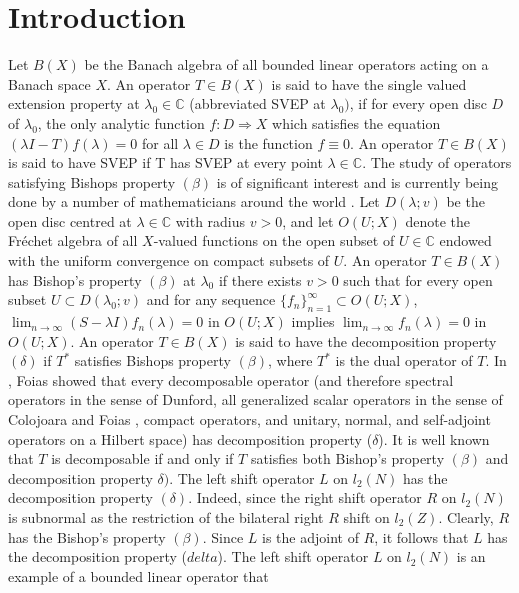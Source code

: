 \documentclass[12pt,a4paper]{amsart}
\begin{document}
\section{Introduction}
Let $B(X)$ be the Banach algebra of all bounded linear operators
acting on a Banach space $X$. An operator $T \in B(X)$ is said to
have the single valued extension property at $\lambda_{0}\in
\mathbb{C}$ (abbreviated SVEP at $\lambda_{0})$, if for every open
disc $D$ of $\lambda_{0}$, the only analytic function $f : D
\Rightarrow X$ which satisfies the equation $(\lambda
I-T)f(\lambda) = 0$ for all $\lambda\in D$ is the function
$f\equiv 0$. An operator $T \in B(X)$ is said to have SVEP if T
has SVEP at every point $\lambda\in\mathbb{C}$. The study of
operators satisfying Bishops property $(\beta)$ is of significant
interest and is currently being done by a number of mathematicians
around the world \cite{17,18,19,20,21}. Let $D(\lambda; v)$ be the
open disc centred at $\lambda\in\mathbb{C}$ with radius $v
> 0$, and let $O(U;X)$ denote the Fr\'echet algebra of all
$X$-valued functions on the open subset of $U\in\mathbb{C}$
endowed with the uniform convergence on compact subsets of $U$. An
operator $T\in B(X)$ has Bishop's property $(\beta)$ at
$\lambda_{0}$ if there exists $v>0$ such that for every open
subset $U \subset D(\lambda_{0}; v)$ and for any sequence
$\{f_{n}\}^{\infty}_{n=1} \subset O(U;X)$, $\lim_{n\rightarrow
\infty}(S-\lambda I)f_{n}(\lambda) = 0$ in $O(U;X)$ implies
$\lim_{n\rightarrow \infty} f_{n}(\lambda) = 0$ in $O(U;X)$. An
operator $T\in B(X)$ is said to have the decomposition property
$(\delta)$ if $T^{ *}$ satisfies Bishops property $(\beta)$, where
$T^{*}$ is the dual operator of $T$. In \cite{6}, Foias showed
that every decomposable operator (and therefore spectral operators
in the sense of Dunford, all generalized scalar operators in the
sense of Colojoara and Foias \cite{6}, compact operators, and
unitary, normal, and self-adjoint operators on a Hilbert space)
has decomposition property ($\delta$). It is well known that $T$
is decomposable if and only if $T$ satisfies both Bishop's
property $(\beta)$ and decomposition property $\delta)$. The left
shift operator $L$ on $l_{2}(N)$ has the decomposition property
$(\delta)$. Indeed, since the right shift operator $R$ on
$l_{2}(N)$ is subnormal as the restriction of the bilateral right
$R$ shift on $l_{2}(Z)$. Clearly, $R$ has the Bishop's property
$(\beta)$. Since $L$ is the adjoint of $R$, it follows that $L$
has the decomposition property ($delta$). The left shift operator
$L$ on $l_{2}(N)$ is an example of a bounded linear operator that
\end{document}
